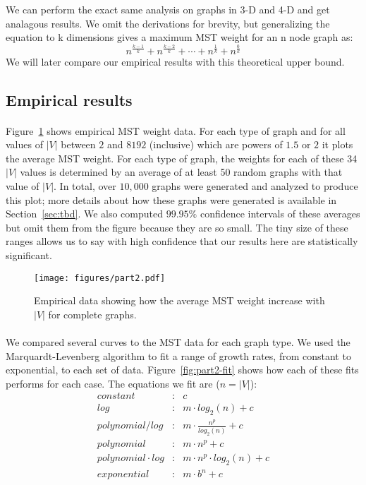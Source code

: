 We can perform the exact same analysis on graphs in 3-D and 4-D and get
analagous results. We omit the derivations for brevity, but generalizing
the equation to k dimensions gives a maximum MST weight for an n node
graph as:
\[ n^{\frac{k-1}{k}} + n^{\frac{k-2}{k}} + \cdots + n^{\frac{1}{k}} +
n^{\frac{0}{k}} \]
We will later compare our empirical results with this theoretical upper
bound.

\subsection{Empirical results}
\paragraph{}
Figure~\ref{fig:part2} shows empirical MST weight data. For each type of
graph and for all values of $|V|$
between $2$ and $8192$ (inclusive) which are powers of $1.5$ or $2$ it
plots the average MST weight.  For each type of graph, the
weights for each of these 34 $|V|$ values is determined by
an average of at least 50 random graphs with that value of $|V|$.  In
total, over $10,000$ graphs
were generated and analyzed to produce this plot; more details about how
these graphs were generated is available in Section~\ref{sec:tbd}.  We
also computed $99.95\%$ confidence intervals of these averages but omit
them from the figure because they are so small.  The tiny size of these
ranges allows us to say with high confidence that our results here are
statistically significant.

\begin{figure}[htb!]
\centering
\texttt{[image: figures/part2.pdf]}
\caption{Empirical data showing how the average MST weight increase with $|V|$
  for complete graphs.}
\label{fig:part2}
\end{figure}

\paragraph{}
We compared several curves to the MST data for each graph type. We used the
Marquardt-Levenberg algorithm to fit a range of growth rates, from constant
to exponential, to each set of data.
Figure~\ref{fig:part2-fit} shows how each of these fits performs for each case.
The equations we fit are ($n = |V|$):
\begin{eqnarray*}
constant&:& c \\
log&:& m \cdot log_2(n) + c \\
polynomial / log&:& m \cdot \frac{n^p}{log_2(n)} + c \\
polynomial&:& m \cdot n^p + c \\
polynomial \cdot log&:& m \cdot n^p \cdot log_2(n) + c \\
exponential&:& m \cdot b^n + c
\end{eqnarray*}

